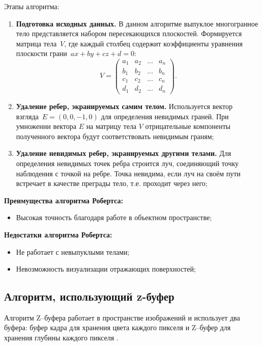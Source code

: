 Этапы алгоритма:
\begin{enumerate}[label=\arabic*)]
	\item \textbf{Подготовка исходных данных.} В данном алгоритме выпуклое многогранное тело представляется набором пересекающихся плоскостей. Формируется матрица тела~$V$, где каждый столбец содержит коэффициенты уравнения плоскости грани~$ax + by + cz + d = 0$:
	\begin{equation}
		V = \begin{pmatrix}
			a_{1} & a_{2} & \ldots & a_{n}\\
			b_{1} & b_{2} & \ldots & b_{n}\\
			c_{1} & c_{2} & \ldots & c_{n}\\
			d_{1} & d_{2} & \ldots & d_{n}
		\end{pmatrix}.
	\end{equation}
	\item \textbf{Удаление ребер, экранируемых самим телом.} Используется вектор взгляда~$E = (0, 0, -1, 0)$ для определения невидимых граней. При умножении вектора $E$ на матрицу тела $V$ отрицательные компоненты полученного вектора будут соответствовать невидимым граням;
	
	\item \textbf{Удаление невидимых ребер, экранируемых другими телами.} Для определения невидимых точек ребра строится луч, соединяющий точку наблюдения с точкой на ребре. Точка невидима, если луч на своём пути встречает в качестве преграды тело, т.е. проходит через него;
\end{enumerate}

\textbf{Преимущества алгоритма Робертса:}
\begin{itemize}
	\item Высокая точность благодаря работе в объектном пространстве;
\end{itemize}

\textbf{Недостатки алгоритма Робертса:}
\begin{itemize}
	\item Не работает с невыпуклыми телами;
	\item Невозможность визуализации отражающих поверхностей;
\end{itemize}


\subsection*{Алгоритм, использующий z-буфер}
Алгоритм Z--буфера работает в пространстве изображений и использует два буфера: буфер кадра для хранения цвета каждого
пикселя и Z--буфер для хранения глубины каждого пикселя \cite{shikinStCG}.

